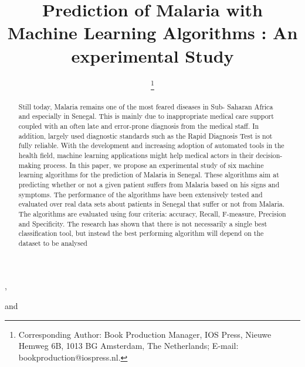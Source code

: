 \documentclass{IOS-Book-Article}
\def\hb{\hbox to 10.7 cm{}}
\begin{document}
\pagestyle{headings}
\def\thepage{}

\begin{frontmatter}              %


\title{Prediction of Malaria with Machine Learning
Algorithms : An experimental Study}

\markboth{}{November 2020\hb}

\author[A]{ %
\thanks{Corresponding Author: Book Production Manager, IOS Press, Nieuwe Hemweg 6B,
1013 BG Amsterdam, The Netherlands; E-mail:
bookproduction@iospress.nl.}},
\author[B]{ }
and
\author[B]{ }

\address[A]{ALioune Diop University of Bambey }
\address[B]{ALioune Diop University of Bambey}

\begin{abstract}
Still today, Malaria remains one of the most feared diseases in Sub- Saharan Africa and especially in Senegal. This is mainly due to inappropriate medical care support coupled with an often late and error-prone diagnosis from the medical staff. In addition, largely used diagnostic standards such as the Rapid Diagnosis Test is not fully reliable. With the development and increasing adoption of automated tools in the health field, machine learning applications might help medical actors in their decision-making process. In this paper, we propose an experimental study of six machine learning algorithms for the prediction of Malaria in Senegal. These algorithms aim at predicting whether or not a given patient suffers from Malaria based on his signs and symptoms. The performance of the algorithms have been extensively tested and evaluated over real data sets about patients in Senegal that suffer or not from Malaria. The algorithms are evaluated using four criteria: accuracy, Recall, F-measure, Precision and Specificity. The research has shown that there is not necessarily a single best classification tool, but instead the best performing algorithm will depend on the dataset to be analysed
\end{abstract}

\begin{keyword}

\end{keyword}
\end{frontmatter}










\begin{thebibliography}{99}
%
\end{thebibliography}
\end{document}

